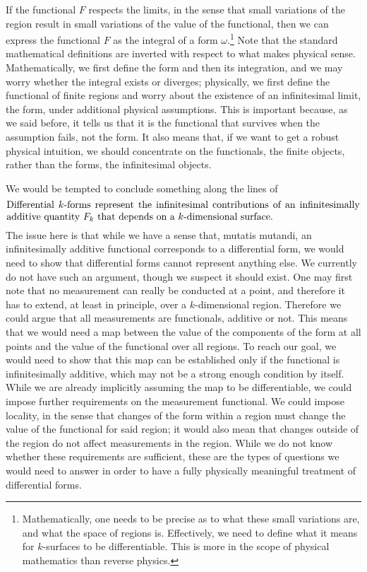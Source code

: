 If the functional $F$ respects the limits, in the sense that small variations of the region result in small variations of the value of the functional, then we can express the functional $F$ as the integral of a form $\omega$.\footnote{Mathematically, one needs to be precise as to what these small variations are, and what the space of regions is. Effectively, we need to define what it means for $k$-surfaces to be differentiable. This is more in the scope of physical mathematics than reverse physics.} Note that the standard mathematical definitions are inverted with respect to what makes physical sense. Mathematically, we first define the form and then its integration, and we may worry whether the integral exists or diverges; physically, we first define the functional of finite regions and worry about the existence of an infinitesimal limit, the form, under additional physical assumptions. This is important because, as we said before, it tells us that it is the functional that survives when the assumption fails, not the form. It also means that, if we want to get a robust physical intuition, we should concentrate on the functionals, the finite objects, rather than the forms, the infinitesimal objects.

We would be tempted to conclude something along the lines of
\begin{equation}
	\parbox{5in}{Differential $k$-forms represent the infinitesimal contributions of an infinitesimally additive quantity $F_k$ that depends on a $k$-dimensional surface.}
\end{equation} 
The issue here is that while we have a sense that, mutatis mutandi, an infinitesimally additive functional corresponds to a differential form, we would need to show that differential forms cannot represent anything else. We currently do not have such an argument, though we suspect it should exist. One may first note that no measurement can really be conducted at a point, and therefore it has to extend, at least in principle, over a $k$-dimensional region. Therefore we could argue that all measurements are functionals, additive or not. This means that we would need a map between the value of the components of the form at all points and the value of the functional over all regions. To reach our goal, we would need to show that this map can be established only if the functional is infinitesimally additive, which may not be a strong enough condition by itself. While we are already implicitly assuming the map to be differentiable, we could impose further requirements on the measurement functional. We could impose locality, in the sense that changes of the form within a region must change the value of the functional for said region; it would also mean that changes outside of the region do not affect measurements in the region. While we do not know whether these requirements are sufficient, these are the types of questions we would need to answer in order to have a fully physically meaningful treatment of differential forms.

